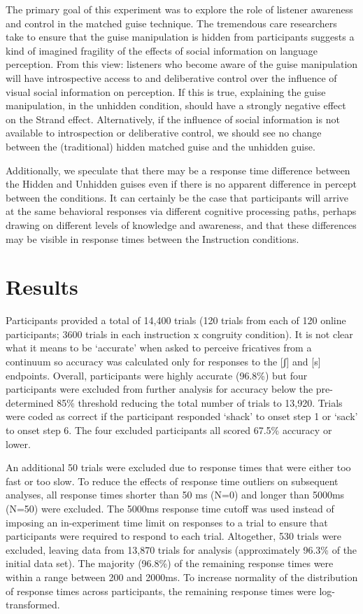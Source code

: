 \documentclass[
  letterpaper,
  DIV=11,
  numbers=noendperiod]{scrartcl}
\begin{document}
The primary goal of this experiment was to explore the role of listener
awareness and control in the matched guise technique. The tremendous
care researchers take to ensure that the guise manipulation is hidden
from participants suggests a kind of imagined fragility of the effects
of social information on language perception. From this view: listeners
who become aware of the guise manipulation will have introspective
access to and deliberative control over the influence of visual social
information on perception. If this is true, explaining the guise
manipulation, in the unhidden condition, should have a strongly negative
effect on the Strand effect. Alternatively, if the influence of social
information is not available to introspection or deliberative control,
we should see no change between the (traditional) hidden matched guise
and the unhidden guise.

Additionally, we speculate that there may be a response time difference
between the Hidden and Unhidden guises even if there is no apparent
difference in percept between the conditions. It can certainly be the
case that participants will arrive at the same behavioral responses via
different cognitive processing paths, perhaps drawing on different
levels of knowledge and awareness, and that these differences may be
visible in response times between the Instruction conditions.

\section{Results}\label{results}

Participants provided a total of 14,400 trials (120 trials from each of
120 online participants; 3600 trials in each instruction x congruity
condition). It is not clear what it means to be `accurate' when asked to
perceive fricatives from a continuum so accuracy was calculated only for
responses to the {[}ʃ{]} and {[}s{]} endpoints. Overall, participants
were highly accurate (96.8\%) but four participants were excluded from
further analysis for accuracy below the pre-determined 85\% threshold
reducing the total number of trials to 13,920. Trials were coded as
correct if the participant responded `shack' to onset step 1 or `sack'
to onset step 6. The four excluded participants all scored 67.5\%
accuracy or lower.

An additional 50 trials were excluded due to response times that were
either too fast or too slow. To reduce the effects of response time
outliers on subsequent analyses, all response times shorter than 50 ms
(N=0) and longer than 5000ms (N=50) were excluded. The 5000ms response
time cutoff was used instead of imposing an in-experiment time limit on
responses to a trial to ensure that participants were required to
respond to each trial. Altogether, 530 trials were excluded, leaving
data from 13,870 trials for analysis (approximately 96.3\% of the
initial data set). The majority (96.8\%) of the remaining response times
were within a range between 200 and 2000ms. To increase normality of the
distribution of response times across participants, the remaining
response times were log-transformed.
\end{document}
